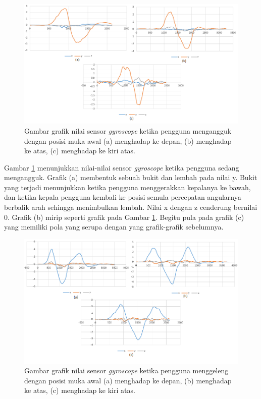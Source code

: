 \begin{figure}[htbp]
\centering
\includegraphics[scale=0.6]{Gambar/grafik-sensor-gyroscope-mengangguk.png}
\caption{Gambar grafik nilai sensor \textit{gyroscope} ketika pengguna mengangguk dengan posisi muka awal (a) menghadap ke depan, (b) menghadap ke atas, (c) menghadap ke kiri atas.}
\label{fig:grafik-sensor-gyroscope-mengangguk}
\end{figure}
Gambar \ref{fig:grafik-sensor-gyroscope-mengangguk} menunjukkan nilai-nilai sensor \textit{gyroscope} ketika pengguna sedang mengangguk. Grafik (a) membentuk sebuah bukit dan lembah pada nilai y. Bukit yang terjadi menunjukkan ketika pengguna menggerakkan kepalanya ke bawah, dan ketika kepala pengguna kembali ke posisi semula percepatan angularnya berbalik arah sehingga menimbulkan lembah. Nilai x dengan z cenderung bernilai 0. Grafik (b) mirip seperti grafik pada Gambar \ref{fig:grafik-sensor-gyroscope-mengangguk}. Begitu pula pada grafik (c) yang memiliki pola yang serupa dengan yang grafik-grafik sebelumnya.

\begin{figure}[htbp]
\centering
\includegraphics[scale=0.6]{Gambar/grafik-sensor-gyroscope-menggeleng.png}
\caption{Gambar grafik nilai sensor \textit{gyroscope} ketika pengguna menggeleng dengan posisi muka awal (a) menghadap ke depan, (b) menghadap ke atas, (c) menghadap ke kiri atas.} 
\label{fig:grafik-sensor-gyroscope-menggeleng}
\end{figure}

